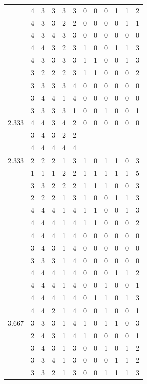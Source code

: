 \documentclass[]{book}
\theoremstyle{definition}
\theoremstyle{definition}
\theoremstyle{definition}
\theoremstyle{remark}
\begin{document}
\begin{table}
{\begin{tabular}[t]{rrrrrrrrrrrr}
 & 4 & 3 & 3 & 3 & 3 & 0 & 0 & 0 & 1 & 1 & 2\\
 & 4 & 3 & 3 & 2 & 2 & 0 & 0 & 0 & 0 & 1 & 1\\
 & 4 & 3 & 4 & 3 & 3 & 0 & 0 & 0 & 0 & 0 & 0\\
 & 4 & 4 & 3 & 2 & 3 & 1 & 0 & 0 & 1 & 1 & 3\\
 & 4 & 3 & 3 & 3 & 3 & 1 & 1 & 0 & 0 & 1 & 3\\
 & 3 & 2 & 2 & 2 & 3 & 1 & 1 & 0 & 0 & 0 & 2\\
 & 3 & 3 & 3 & 3 & 4 & 0 & 0 & 0 & 0 & 0 & 0\\
 & 3 & 4 & 4 & 1 & 4 & 0 & 0 & 0 & 0 & 0 & 0\\
 & 3 & 3 & 3 & 3 & 1 & 0 & 0 & 1 & 0 & 0 & 1\\
2.333 & 4 & 4 & 3 & 4 & 2 & 0 & 0 & 0 & 0 & 0 & 0\\
 & 3 & 4 & 3 & 2 & 2 &  &  &  &  &  & \\
 & 4 & 4 & 4 & 4 & 4 &  &  &  &  &  & \\
2.333 & 2 & 2 & 2 & 1 & 3 & 1 & 0 & 1 & 1 & 0 & 3\\
 & 1 & 1 & 1 & 2 & 2 & 1 & 1 & 1 & 1 & 1 & 5\\
 & 3 & 3 & 2 & 2 & 2 & 1 & 1 & 1 & 0 & 0 & 3\\
 & 2 & 2 & 2 & 1 & 3 & 1 & 0 & 0 & 1 & 1 & 3\\
 & 4 & 4 & 4 & 1 & 4 & 1 & 1 & 0 & 0 & 1 & 3\\
 & 4 & 4 & 4 & 1 & 4 & 1 & 1 & 0 & 0 & 0 & 2\\
 & 4 & 4 & 4 & 1 & 4 & 0 & 0 & 0 & 0 & 0 & 0\\
 & 3 & 4 & 3 & 1 & 4 & 0 & 0 & 0 & 0 & 0 & 0\\
 & 3 & 3 & 3 & 1 & 4 & 0 & 0 & 0 & 0 & 0 & 0\\
 & 4 & 4 & 4 & 1 & 4 & 0 & 0 & 0 & 1 & 1 & 2\\
 & 4 & 4 & 4 & 1 & 4 & 0 & 0 & 1 & 0 & 0 & 1\\
 & 4 & 4 & 4 & 1 & 4 & 0 & 1 & 1 & 0 & 1 & 3\\
 & 4 & 4 & 2 & 1 & 4 & 0 & 0 & 1 & 0 & 0 & 1\\
3.667 & 3 & 3 & 3 & 1 & 4 & 1 & 0 & 1 & 1 & 0 & 3\\
 & 2 & 4 & 3 & 1 & 4 & 1 & 0 & 0 & 0 & 0 & 1\\
 & 3 & 4 & 3 & 1 & 3 & 0 & 0 & 1 & 0 & 1 & 2\\
 & 3 & 3 & 4 & 1 & 3 & 0 & 0 & 0 & 1 & 1 & 2\\
 & 3 & 3 & 2 & 1 & 3 & 0 & 0 & 1 & 1 & 1 & 3\\

\end{tabular}}
\end{table}
\end{document}
